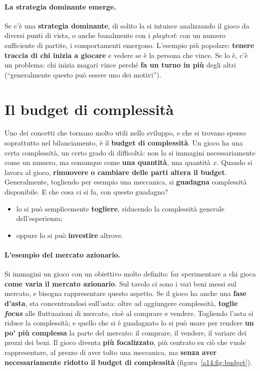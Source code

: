 \paragraph{La strategia dominante emerge.} Se c'è una \textbf{strategia dominante}, di solito
la si intuisce analizzando il gioco da diversi punti di vista, o anche banalmente con i
\emph{playtest}: con un numero sufficiente di partite, i comportamenti emergono. L'esempio più
popolare: \textbf{tenere traccia di chi inizia a giocare} e vedere se è la persona che vince.
Se lo è, c'è un problema: chi inizia magari vince perché \textbf{fa un turno in più} degli
altri (``generalmente questo può essere uno dei motivi'').

\section{Il budget di complessità}
\label{a14:sec:budget}

Uno dei concetti che tornano molto utili nello sviluppo, e che si trovano spesso soprattutto
nel bilanciamento, è il \textbf{budget di complessità}. Un gioco ha una certa complessità, un
certo grado di difficoltà: non la si immagini necessariamente come un numero, ma comunque come
\textbf{una quantità}, una quantità $x$. Quando si lavora al gioco, \textbf{rimuovere o
cambiare delle parti altera il budget}. Generalmente, togliendo per esempio una meccanica, si
\textbf{guadagna} complessità disponibile. E che cosa ci si fa, con questo guadagno?
\begin{itemize}
  \item lo si può semplicemente \textbf{togliere}, riducendo la complessità generale
        dell'esperienza;
  \item oppure lo si può \textbf{investire} altrove.
\end{itemize}

\paragraph{L'esempio del mercato azionario.} Si immagini un gioco con un obiettivo molto
definito: far sperimentare a chi gioca \textbf{come varia il mercato azionario}. Sul tavolo ci
sono i vari beni messi sul mercato, e bisogna rappresentare questo aspetto. Se il gioco ha
anche una \textbf{fase d'asta}, sta concentrandosi sull'asta: oltre ad aggiungere complessità,
\textbf{toglie \emph{focus}} alle fluttuazioni di mercato, cioè al comprare e vendere.
Togliendo l'asta si riduce la complessità; e quello che si è guadagnato lo si può usare per
rendere \textbf{un po' più complessa} la parte del mercato: il comprare, il vendere, il variare
dei prezzi dei beni. Il gioco diventa \textbf{più focalizzato}, più centrato su ciò che vuole
rappresentare, al prezzo di aver tolto una meccanica, ma \textbf{senza aver necessariamente
ridotto il budget di complessità} (figura~\ref{a14:fig:budget}).


